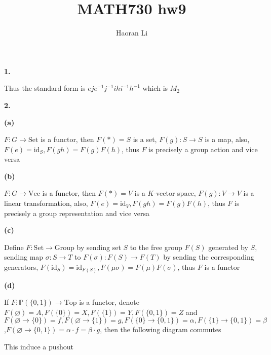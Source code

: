 \documentclass[12pt]{article}
\title{MATH730 hw9}
\author{Haoran Li}
\date{}
\begin{document}
\maketitle
\textbf{1.} \par
\vspace{13cm}
Thus the standard form is $eje^{-1}j^{-1}ihi^{-1}h^{-1}$ which is $M_2$ \par
\textbf{2.} \par
\textbf{(a)} \par
$F:G\rightarrow\mathrm{Set}$ is a functor, then $F(*)=S$ is a set, $F(g):S\rightarrow S$ is a map, also, $F(e)=\mathrm{id}_S, F(gh)=F(g)F(h)$, thus $F$ is precisely a group action and vice versa \par
\textbf{(b)} \par
$F:G\rightarrow\mathrm{Vec}$ is a functor, then $F(*)=V$ is a $K$-vector space, $F(g):V\rightarrow V$ is a linear transformation, also, $F(e)=\mathrm{id}_V, F(gh)=F(g)F(h)$, thus $F$ is precisely a group representation and vice versa \par
\textbf{(c)} \par
Define $F:\mathrm{Set}\rightarrow\mathrm{Group}$ by sending set $S$ to the free group $F(S)$ generated by $S$, sending map $\sigma:S\rightarrow T$ to $F(\sigma):F(S)\rightarrow F(T)$ by sending the corresponding generators, $F(\mathrm{id}_S)=\mathrm{id}_{F(S)},F(\mu\sigma)=F(\mu)F(\sigma)$, thus $F$ is a functor \par
\textbf{(d)} \par
If $F:\mathbb{P}(\{0,1\})\rightarrow \mathrm{Top}$ is a functor, denote $F(\varnothing)=A,F(\{0\})=X,F(\{1\})=Y,F(\{0,1\})=Z$ and $F(\varnothing\rightarrow\{0\})=f,F(\varnothing\rightarrow\{1\})=g,F(\{0\}\rightarrow\{0,1\})=\alpha,F(\{1\}\rightarrow\{0,1\})=\beta$,$F(\varnothing\rightarrow\{0,1\})=\alpha\cdot f=\beta\cdot g$, then the following diagram commutes \par
\begin{center}
\end{center}
This induce a pushout \par
\begin{center}
\end{center}
\end{document}

